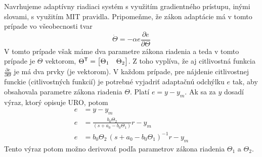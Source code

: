 \documentclass[a4paper, 10pt, ]{article}
\begin{document}
\noindent
Navrhujeme adaptívny riadiaci systém s využitím gradientného prístupu, inými slovami, s využitím MIT pravidla. Pripomeňme, že zákon adaptácie má v tomto prípade vo všeobecnosti tvar
\begin{equation}
	\dot \Theta = - \alpha e \frac{\partial e}{\partial \Theta}
\end{equation}
V tomto prípade však máme dva parametre zákona riadenia a teda v tomto prípade je $\Theta$ vektorom, $\Theta^{\mathsf{T}} = \begin{bmatrix} \Theta_1 & \Theta_2 \end{bmatrix}$. Z toho vyplíva, že aj citlivostná funkcia $\frac{\partial e}{\partial \Theta}$ je má dva prvky (je vektorom). V každom prípade, pre nájdenie citlivostnej funckie (citlivostných funkcií) je potrebné vyjadriť adaptačnú odchýlku $e$ tak, aby obsahovala parametre zákona riadenia $\Theta$. Platí $e = y - y_m$. Ak sa za $y$ dosadí výraz, ktorý opisuje URO, potom
\begin{subequations}
    \begin{align}
        e &= y - y_m \\
        e &= \frac{b_0 \Theta_2}{\left( s + a_0 - b_0 \Theta_1 \right)} r - y_m \\
        e &= b_0 \Theta_2 \, \left( s + a_0 - b_0 \Theta_1 \right)^{-1} r - y_m
    \end{align}
\end{subequations}
Tento výraz potom možno derivovať podľa parametrov zákona riadenia $\Theta_1$ a $\Theta_2$.
\end{document}
